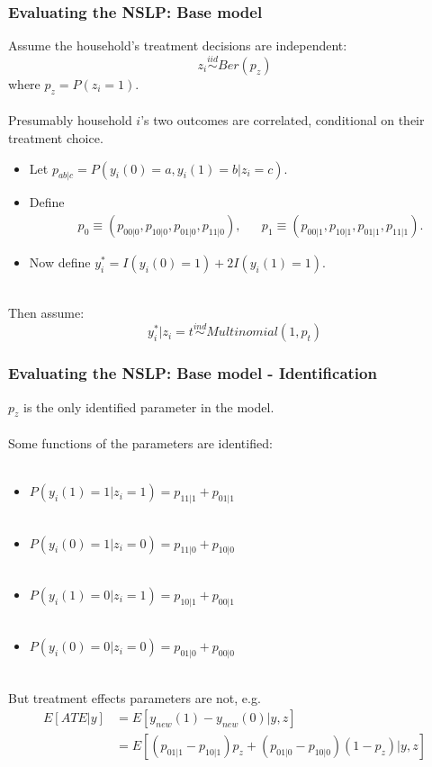 \documentclass[xcolor=dvipsnames]{beamer}
\begin{document}
\begin{frame}
  \frametitle{Evaluating the NSLP: Base model}
Assume the household's treatment decisions are independent:
    \[
    z_i \stackrel{iid}{\sim}Ber(p_z)
    \]
    where $p_z=P(z_i=1)$.\\~\\
\pause Presumably household $i$'s two outcomes are correlated, conditional on their treatment choice. 
    \begin{itemize}
      \item Let $  p_{ab|c} = P(y_i(0)=a, y_i(1)=b|z_i=c)$.
      \item Define 
        \begin{align*}
          &p_0\equiv (p_{00|0}, p_{10|0}, p_{01|0}, p_{11|0}), &&p_1\equiv (p_{00|1}, p_{10|1}, p_{01|1}, p_{11|1}).
        \end{align*}
      \item Now define $y_i^*=I(y_i(0)=1) + 2I(y_i(1)=1)$. \\~
      \end{itemize}
\pause Then assume:
    \[
    y_i^*|z_i=t \stackrel{ind}{\sim}Multinomial(1,p_t)
    \]
\end{frame}

\begin{frame}
  \frametitle{Evaluating the NSLP: Base model - Identification}
$p_z$ is the only identified parameter in the model.\\~\\
 Some functions of the parameters are identified: \\~\\
    \begin{itemize}
      \item $P(y_i(1)=1|z_i=1) = p_{11|1} + p_{01|1}$\\~\\  
      \item $P(y_i(0)=1|z_i=0) =p_{11|0} + p_{10|0}$\\~\\
      \item $P(y_i(1)=0|z_i=1) =p_{10|1} + p_{00|1}$\\~\\ 
      \item $P(y_i(0)=0|z_i=0) =p_{01|0} + p_{00|0}$\\~\\
      \end{itemize}
But treatment effects parameters are not, e.g.
\begin{align*}
E[ATE|y] &= E[y_{new}(1) - y_{new}(0)|y,z] \\
&=E[(p_{01|1} - p_{10|1})p_z + (p_{01|0} - p_{10|0})(1-p_z)|y,z] 
\end{align*}
\end{frame}
\end{document}
